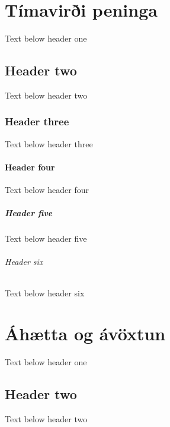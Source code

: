 \documentclass[a4paper,10pt,icelandic]{sphinxmanual}
\begin{document}
\sphinxstepscope


\chapter{Tímavirði peninga}
\label{\detokenize{timavirdi-peninga/index:timaviri-peninga}}\label{\detokenize{timavirdi-peninga/index::doc}}
\sphinxAtStartPar
Text below header one


\section{Header two}
\label{\detokenize{timavirdi-peninga/index:header-two}}
\sphinxAtStartPar
Text below header two


\subsection{Header three}
\label{\detokenize{timavirdi-peninga/index:header-three}}
\sphinxAtStartPar
Text below header three


\subsubsection{Header four}
\label{\detokenize{timavirdi-peninga/index:header-four}}
\sphinxAtStartPar
Text below header four


\paragraph{Header five}
\label{\detokenize{timavirdi-peninga/index:header-five}}
\sphinxAtStartPar
Text below header five


\subparagraph{Header six}
\label{\detokenize{timavirdi-peninga/index:header-six}}
\sphinxAtStartPar
Text below header six

\sphinxstepscope


\chapter{Áhætta og ávöxtun}
\label{\detokenize{ahaetta-og-avoxtun/index:ahaetta-og-avoxtun}}\label{\detokenize{ahaetta-og-avoxtun/index::doc}}
\sphinxAtStartPar
Text below header one


\section{Header two}
\label{\detokenize{ahaetta-og-avoxtun/index:header-two}}
\sphinxAtStartPar
Text below header two
\end{document}
